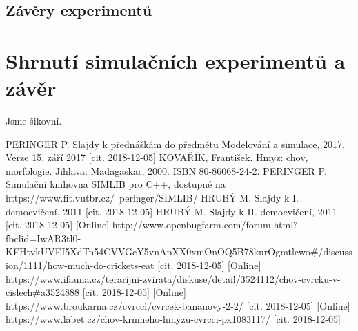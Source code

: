 \documentclass[11pt, a4paper, titlepage]{article}
\begin{document}
    \subsection{Závěry experimentů}

    \section{Shrnutí simulačních experimentů a závěr}
    Jsme šikovní.

    \begin{thebibliography}{zdroje}
         \label{ims} PERINGER P. Slajdy k přednáškám do předmětu Modelování a simulace, 2017. Verze 15. září 2017 [cit. 2018-12-05]
         \label{kniha} KOVAŘÍK, František. Hmyz: chov, morfologie. Jihlava: Madagaskar, 2000. ISBN 80-86068-24-2.
         \label{simlib} PERINGER P. Simulační knihovna SIMLIB pro C++, dostupné na https://www.fit.vutbr.cz/~peringer/SIMLIB/
         \label{prvnidemo} HRUBÝ M. Slajdy k I. democvičení, 2011 [cit. 2018-12-05]
         \label{druhedemo} HRUBÝ M. Slajdy k II. democvičení, 2011 [cit. 2018-12-05]
         \label{jidlo} [Online] http://www.openbugfarm.com/forum.html?fbclid=IwAR3tl0-KFHtvkUVEI5XdTn54CVVGcY5vnApXX0xmOnOQ5B78kurOgmtlcwo\#/discussion/1111/how-much-do-crickets-eat [cit. 2018-12-05]
         \label{forum} [Online] https://www.ifauna.cz/terarijni-zvirata/diskuse/detail/3524112/chov-cvrcku-v-cislech\#a3524888 [cit. 2018-12-05]
         \label{cena} [Online] https://www.broukarna.cz/cvrcci/cvrcek-bananovy-2-2/ [cit. 2018-12-05]
         \label{topeni} [Online] https://www.labet.cz/chov-krmneho-hmyzu-cvrcci-px1083117/ [cit. 2018-12-05]
    \end{thebibliography}
\end{document}
